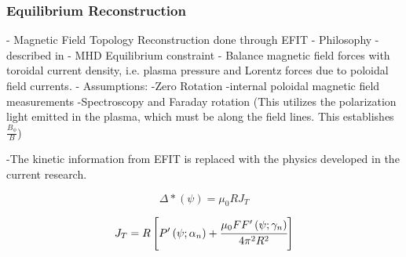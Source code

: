 \subsubsection{Equilibrium Reconstruction} \label{subsub:EFIT}
- Magnetic Field Topology Reconstruction done through EFIT
- Philosophy - described in \cite{Lao1990}
- MHD Equilibrium constraint
- Balance magnetic field forces with toroidal current density, i.e. plasma pressure and Lorentz forces due to poloidal field currents.
- Assumptions:
-Zero Rotation
-internal poloidal magnetic field measurements
-Spectroscopy and Faraday rotation (This utilizes the polarization light emitted in the plasma, which must be along the field lines. This establishes $\frac{B_\phi}{B}$)

-The kinetic information from EFIT is replaced with the physics developed in the current research.

\begin{equation}
	\Delta \ast \left(\psi\right) = \mu_0 R J_T
\end{equation}

\begin{equation}
	J_T = R \left[ P'\left(\psi; \alpha_n\right) + \cfrac{\mu_0 FF' \left(\psi; \gamma_n \right)}{4 \pi^2 R^2}\right]
\end{equation}
